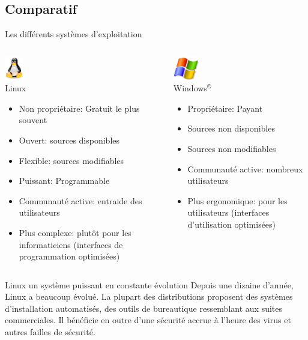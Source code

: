 \subsection{Comparatif}
\begin{frame}{Les différents systèmes d'exploitation}
  \begin{columns}
    \begin{column}{5.5cm}
      \begin{block}{\center \includegraphics[height=1cm]{img/s01/Tux.png}\\Linux}
        \begin{itemize}
        \item	Non propriétaire: Gratuit le plus souvent
        \item Ouvert: sources disponibles
        \item Flexible: sources modifiables
        \item Puissant: Programmable
        \item Communauté active: entraide des utilisateurs
        \item Plus complexe: plutôt pour les informaticiens (interfaces de programmation optimisées)
        \end{itemize}
      \end{block}
    \end{column}
    \begin{column}{5.5cm}
      \begin{block}{\center \includegraphics[height=1cm]{img/s01/Windows_logo.png}\\Windows$^©$}
        \begin{itemize}
        \item	Propriétaire: Payant
        \item Sources non disponibles
        \item Sources non modifiables
        \item Communauté active: nombreux utilisateurs
        \item Plus ergonomique: pour les utilisateurs (interfaces d'utilisation optimisées)
        \end{itemize}
        \vrule
      \end{block}
    \end{column}
  \end{columns}
  \begin{alertblock}{Linux un système puissant en constante évolution}
    Depuis une dizaine d'année, Linux a beaucoup évolué. La plupart des distributions proposent des systèmes d'installation automatisés, des outils de bureautique ressemblant aux suites commerciales. Il bénéficie en outre d'une sécurité accrue à l'heure des virus et autres failles de sécurité.
  \end{alertblock}
\end{frame}		
